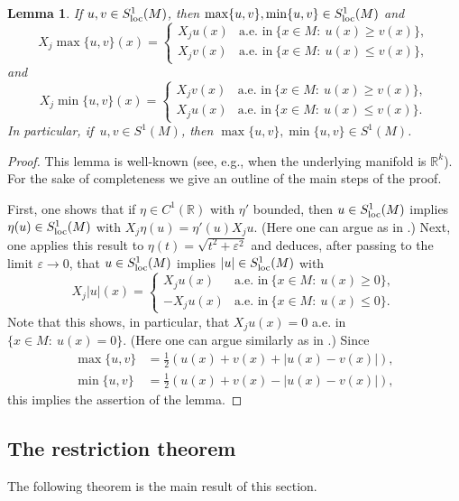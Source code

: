 \documentclass[10pt]{amsart}
\newcommand{\loc}{\textup{loc}}
\newtheorem{lemma}[theorem]{Lemma}
\theoremstyle{definition}
\let\epsilon\varepsilon
\newcommand{\1}{\mathbbm{1}}
\newcommand{\R}{\mathbb{R}}
\begin{document}
\begin{lemma}\label{truncation}
If $u,v\in S^1_\loc(M)$, then $\max\{u,v\}, \min\{u,v\}\in S^1_\loc(M)$ and
\[
X_j \max\{u,v\}(x) = \begin{cases}
X_j u(x) & \text{a.e.\ in}\ \{ x\in M:\ u(x)\geq v(x)\},\\
X_jv(x) & \text{a.e.\ in}\ \{ x\in M:\ u(x)\leq v(x)\},
\end{cases}
\]
and
\[
X_j \min\{u,v\}(x) = \begin{cases}
X_j v(x) & \text{a.e.\ in}\ \{ x \in M:\ u(x)\geq v(x) \},\\
X_ju(x) & \text{a.e.\ in}\ \{ x \in M:\ u(x)\leq v(x) \}.
\end{cases}
\]
In particular, if~$u,v\in S^1(M)$, then $\max\{u,v\}, \min\{u,v\}\in S^1(M)$.
\end{lemma}

\begin{proof}
This lemma is well-known (see, e.g., \cite[Lem.\,3.5]{GaNh} when the underlying manifold is $\R^k$). For the sake of completeness we give an outline of the main steps of the proof.

First, one shows that if $\eta\in C^1(\R)$ with $\eta'$ bounded, then $u\in S^1_\loc(M)$ implies $\eta(u)\in S^1_\loc(M)$ with $X_j\eta(u) = \eta'(u)X_j u$. (Here one can argue as in \cite[Th.\,1.18]{HeKiMa}.) Next, one applies this result to $\eta(t)=\sqrt{t^2+\epsilon^2}$ and deduces, after passing to the limit $\epsilon\to 0$, that $u\in S^1_\loc(M)$ implies $|u|\in S^1_\loc(M)$ with
\[
X_j|u|(x) =
\begin{cases}
X_j u(x) & \text{a.e.\ in}\ \{ x\in M:\ u(x)\geq 0\},\\
- X_ju(x) & \text{a.e.\ in}\ \{ x\in M:\ u(x)\leq 0 \}.
\end{cases}
\]
Note that this shows, in particular, that $X_j u(x)=0$ a.e. in $\{x\in M:\ u(x)=0\}$. (Here one can argue similarly as in \cite[Lem.\,1.19]{HeKiMa}.) Since
\begin{align*}
\max\{u,v\} & = \tfrac12(u(x)+v(x) + |u(x)-v(x)|), \\
\min\{u,v\} & = \tfrac12(u(x)+v(x) - |u(x)-v(x)|),
\end{align*}
this implies the assertion of the lemma.
\end{proof}

\subsection{The restriction theorem}
The following theorem is the main result of this section.
\end{document}
